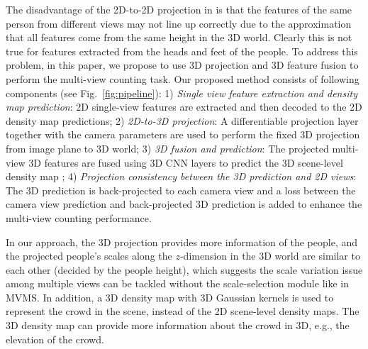 \documentclass[letterpaper]{article} %
\newcommand{\NOTE}[1]{\textcolor{black}{}}
\newcommand{\CUT}[1]{}
\newcommand{\citep}{\cite}
\begin{document}
The disadvantage of the 2D-to-2D projection in \citep{zhang2019wide} is that the features of the same person from different views may not line up correctly due to the approximation that all features come from the same height in the 3D world. Clearly this is not true for features extracted from the heads and feet of the people.
To address this problem,
in this paper,
we propose to use 3D projection and 3D feature fusion to perform the multi-view counting task. Our proposed method consists of following components (see Fig.~\ref{fig:pipeline}): 1) \emph{Single view feature extraction and density map prediction}: 2D single-view features are extracted and then decoded to the 2D density map predictions; 2) \emph{2D-to-3D projection}: A differentiable projection layer together with the camera parameters are used to perform the fixed 3D projection from image plane to 3D world; 3) \emph{3D fusion and prediction}: The projected multi-view 3D features are fused using 3D CNN layers to predict the 3D scene-level density map \CUT{and $z$-dim full-size 3D filters are adopted to handle the scale variation issue}; 4) \emph{Projection consistency between the 3D prediction and 2D views}: The 3D prediction is back-projected to each camera view and a loss between the camera view prediction and back-projected 3D prediction is added to enhance the multi-view counting performance.

In our approach, the 3D projection provides more information of the people, and the projected people's scales along the $z$-dimension in the 3D world are similar to each other (decided by the people height), which suggests the scale variation issue among multiple views can be tackled without the scale-selection module like in MVMS. In addition, a 3D density map with 3D Gaussian kernels is used to represent the crowd in the scene, instead of the 2D scene-level density maps. The 3D density map can provide more information about the crowd in 3D, e.g., the elevation of the crowd. %
\CUT{The prediction of the 3D density map is also used as an %
intermediate representation to enforce the projection consistency across the camera views, which can further improve the multi-view counting performance.
}
\end{document}
